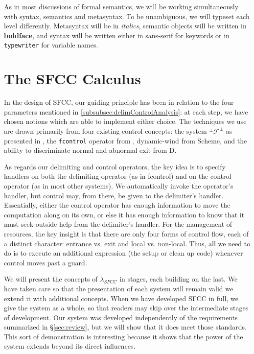 \documentclass[11pt]{article}
\newcommand{\maybePage}{\newpage}
\newcommand\F{\mathcal{F}}
\newcommand\pmFpm{^\pm\F^\pm}
\begin{document}
As in most discussions of formal semantics, we will be working simultaneously with syntax, semantics and metasyntax. To be unambiguous, we will typeset each level differently. Metasyntax will be in \textit{italics}, semantic objects will be written in \textbf{boldface}, and syntax will be written either in \textsf{sans-serif} for keywords or in \texttt{typewriter} for variable names.





\maybePage
\section{The SFCC Calculus}
\label{sec:SFCCcalculus}

In the design of SFCC, our guiding principle has been in relation to the four parameters mentioned in \ref{subsubsec:delimControlAnalysis}:
at each step, we have chosen notions which are able to implement either choice.
The techniques we use are drawn primarily from four existing control concepts:
the system $\pmFpm$ as presented in \cite{MFDC}, the \texttt{fcontrol} operator from \cite{HandlingControl}, dynamic-wind from Scheme, and the ability to discriminate normal and abnormal exit from D.

As regards our delimiting and control operators, the key idea is to specify handlers on both the delimiting operator (as in fcontrol) and on the control operator (as in most other systems).
We automatically invoke the operator's handler, but control may, from there, be given to the delimiter's handler.
Essentially, either the control operator has enough information to move the computation along on its own, or else it has enough information to know that it must seek outside help from the delimiter's handler.
For the management of resources, the key insight is that there are only four forms of control flow, each of a distinct character: entrance vs. exit and local vs. non-local.
Thus, all we need to do is to execute an additional expression (the setup or clean up code) whenever control moves past a guard.

We will present the concepts of $\lambda_{SFCC}$ in stages, each building on the last.
We have taken care so that the presentation of each system will remain valid we extend it with additional concepts.
When we have developed SFCC in full, we give the system as a whole, so that readers may skip over the intermediate stages of development.
Our system was developed independently of the requirements summarized in \S\ref{sec:review}, but we will show that it does meet those standards.
This sort of demonstration is interesting because it shows that the power of the system extends beyond its direct influences.
\end{document}
